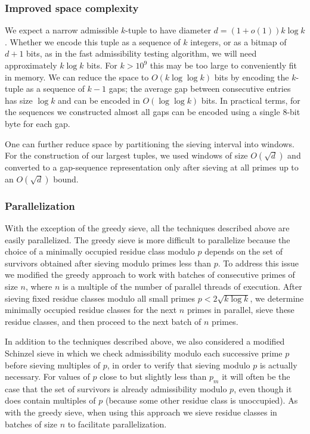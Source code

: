\subsubsection{Improved space complexity}
We expect a narrow admissible $k$-tuple to have diameter $d=(1+o(1))k\log k$.
Whether we encode this tuple as a sequence of $k$ integers, or as a bitmap of $d+1$ bits, as in the fast admissibility testing algorithm, we will need approximately $k\log k$ bits.  For $k > 10^9$ this may be too large to conveniently fit in memory.  We can reduce the space to $O(k\log\log k)$ bits by encoding the $k$-tuple as a sequence of $k-1$ gaps; the average gap between consecutive entries has size $\log k$ and can be encoded in $O(\log\log k)$ bits.
In practical terms, for the sequences we constructed almost all gaps can be encoded using a single 8-bit byte for each gap.

One can further reduce space by partitioning the sieving interval into windows.
For the construction of our largest tuples, we used windows of size $O(\sqrt{d})$ and converted to a gap-sequence representation only after sieving at all primes up to an $O(\sqrt{d})$ bound.

\subsubsection{Parallelization}
With the exception of the greedy sieve, all the techniques described above are easily parallelized.
The greedy sieve is more difficult to parallelize because the choice of a minimally occupied residue class modulo $p$ depends on the set of survivors obtained after sieving modulo primes less than $p$.
To address this issue we modified the greedy approach to work with batches of consecutive primes of size $n$, where $n$ is a multiple of the number of parallel threads of execution.  After sieving fixed residue classes modulo all small primes $p < 2\sqrt{k\log k}$, we determine minimally occupied residue classes for the next $n$ primes in parallel, sieve these residue classes, and then proceed to the next batch of $n$ primes.

In addition to the techniques described above, we also considered a modified Schinzel sieve in which we check admissibility modulo each successive prime $p$ before sieving multiples of $p$, in order to verify that sieving modulo $p$ is actually necessary.  For values of $p$ close to but slightly less than $p_m$ it will often be the case that the set of survivors is already admissibility modulo $p$, even though it does contain multiples of $p$ (because some other residue class is unoccupied).
As with the greedy sieve, when using this approach we sieve residue classes in batches of size $n$ to facilitate parallelization.

